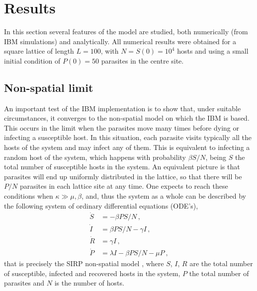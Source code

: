 \section{Results}\label{sec:results}
In this section several features of the model are studied, both numerically
(from IBM simulations) and analytically. All numerical results were obtained
for a square lattice of length $L=100$, with $N=S(0)=10^4$ hosts and using a
small initial condition of $P(0)=50$ parasites in the centre site.

\subsection{Non-spatial limit} \label{sec:MFlimit}
An important test of the IBM implementation is to show that, under suitable
circumstances, it converges to the non-spatial model on which the IBM is based.
This occurs in the limit when the parasites move many times before dying or
infecting a susceptible host. In this situation, each parasite visits typically
all the hosts of the system and may infect any of them. This is equivalent to
infecting a random host of the system, which happens with probability $\beta
    S/N$, being $S$ the total number of susceptible hosts in the system. An
equivalent picture is that parasites will end up uniformly distributed in the
lattice, so that there will be $P/N$ parasites in each lattice site at any
time. One expects to reach these conditions when $\kappa\gg\mu,\beta$, and,
thus the system as a whole can be described by the following system of ordinary
differential equations (ODE's),
\begin{equation}\label{eq:SIRP_MF}
    \begin{aligned}
        \dot{S} & =-\beta P S/N \, ,               \\
        \dot{I} & =\beta P S/N-\gamma I \, ,       \\
        \dot{R} & =\gamma I \, ,                   \\
        \dot{P} & =\lambda I-\beta P S/N-\mu P \ ,
    \end{aligned}
\end{equation}
that is precisely the SIRP non-spatial model \cite{GimenezRomero2021}, where
$S$, $I$, $R$ are the total number of susceptible, infected and recovered hosts
in the system, $P$ the total number of parasites and $N$ is the number of
hosts.

